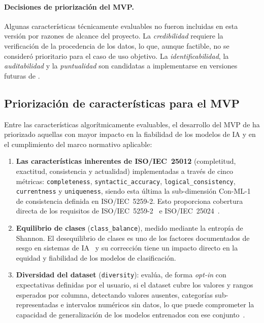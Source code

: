 \paragraph{Decisiones de priorización del \ac{MVP}.}
Algunas características técnicamente evaluables no fueron incluidas en esta
versión por razones de alcance del proyecto. La \emph{credibilidad} requiere
la verificación de la procedencia de los datos, lo que, aunque factible,
no se consideró prioritario para el caso de uso objetivo. La
\emph{identificabilidad}, la \emph{auditabilidad} y la \emph{puntualidad}
son candidatas a implementarse en versiones futuras de \dataqual.

\subsection{Priorización de características para el MVP}
\label{sec:priorizacion-mvp}

Entre las características algorítmicamente evaluables, el desarrollo del
\ac{MVP} de \dataqual ha priorizado aquellas con mayor impacto en la fiabilidad
de los modelos de \ac{IA} y en el cumplimiento del marco normativo aplicable:

\begin{enumerate}
  \item \textbf{Las características inherentes de \ac{ISO}/IEC~25012}
    (completitud, exactitud, consistencia y actualidad) implementadas a través
    de cinco métricas: \texttt{completeness}, \texttt{syntactic\_accuracy},
    \texttt{logical\_consistency}, \texttt{currentness} y \texttt{uniqueness},
    siendo esta última la sub-dimensión Con-ML-1 de consistencia definida en
    \ac{ISO}/IEC~5259-2. Esto proporciona cobertura directa de los requisitos
    de \ac{ISO}/IEC~5259-2~\citep{iso5259} e \ac{ISO}/IEC~25024~\citep{iso25024}.

  \item \textbf{Equilibrio de clases} (\texttt{class\_balance}), medido
    mediante la entropía de Shannon. El desequilibrio de clases es uno de los
    factores documentados de sesgo en sistemas de \ac{IA}~\citep{amazon2018,
    buolamwini2018} y su corrección tiene un impacto directo en la equidad y
    fiabilidad de los modelos de clasificación.

  \item \textbf{Diversidad del dataset} (\texttt{diversity}): evalúa, de
    forma \emph{opt-in} con expectativas definidas por el usuario, si el
    dataset cubre los valores y rangos esperados por columna, detectando
    valores ausentes, categorías sub-representadas e intervalos numéricos
    sin datos, lo que puede comprometer la capacidad de generalización de
    los modelos entrenados con ese conjunto~\citep{iso5259}.

\end{enumerate}

